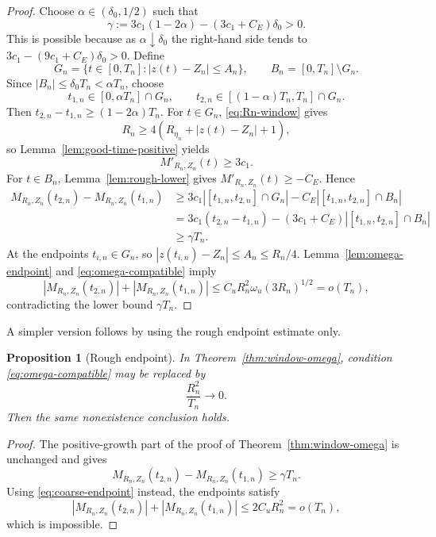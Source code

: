 \documentclass[preprint,12pt]{elsarticle}
\numberwithin{equation}{section}
\newtheorem{proposition}[theorem]{Proposition}
\theoremstyle{remark}
\begin{document}
\begin{proof}
Choose $\alpha\in(\delta_0,1/2)$ such that
\[
  \gamma:=3c_1(1-2\alpha)-(3c_1+C_E)\delta_0>0.
\]
This is possible because as $\alpha\downarrow\delta_0$ the right-hand side tends to $3c_1-(9c_1+C_E)\delta_0>0$.  Define
\[
  G_n=\{t\in[0,T_n]: |z(t)-Z_n|\le A_n\},
  \qquad B_n=[0,T_n]\setminus G_n.
\]
Since $|B_n|\le\delta_0T_n<\alpha T_n$, choose
\[
  t_{1,n}\in[0,\alpha T_n]\cap G_n,
  \qquad t_{2,n}\in[(1-\alpha)T_n,T_n]\cap G_n.
\]
Then $t_{2,n}-t_{1,n}\ge(1-2\alpha)T_n$.  For $t\in G_n$, \eqref{eq:Rn-window} gives
\[
  R_n\ge4(R_{\eta_n}+|z(t)-Z_n|+1),
\]
so Lemma~\ref{lem:good-time-positive} yields
\[
  M'_{R_n,Z_n}(t)\ge3c_1.
\]
For $t\in B_n$, Lemma~\ref{lem:rough-lower} gives $M'_{R_n,Z_n}(t)\ge-C_E$.  Hence
\begin{align*}
  M_{R_n,Z_n}(t_{2,n})-M_{R_n,Z_n}(t_{1,n})
  &\ge 3c_1|[t_{1,n},t_{2,n}]\cap G_n|
       -C_E|[t_{1,n},t_{2,n}]\cap B_n| \\
  &=3c_1(t_{2,n}-t_{1,n})-(3c_1+C_E)|[t_{1,n},t_{2,n}]\cap B_n| \\
  &\ge \gamma T_n.
\end{align*}
At the endpoints $t_{i,n}\in G_n$, so $|z(t_{i,n})-Z_n|\le A_n\le R_n/4$.  Lemma~\ref{lem:omega-endpoint} and \eqref{eq:omega-compatible} imply
\[
  |M_{R_n,Z_n}(t_{2,n})|+|M_{R_n,Z_n}(t_{1,n})|
  \le C_uR_n^2\omega_u(3R_n)^{1/2}=o(T_n),
\]
contradicting the lower bound $\gamma T_n$.
\end{proof}

A simpler version follows by using the rough endpoint estimate only.

\begin{proposition}[Rough endpoint]\label{prop:coarse-window}
In Theorem~\ref{thm:window-omega}, condition \eqref{eq:omega-compatible} may be replaced by
\begin{equation}\label{eq:coarse-compatible}
  \frac{R_n^2}{T_n}\to0.
\end{equation}
Then the same nonexistence conclusion holds.
\end{proposition}

\begin{proof}
The positive-growth part of the proof of Theorem~\ref{thm:window-omega} is unchanged and gives
\[
  M_{R_n,Z_n}(t_{2,n})-M_{R_n,Z_n}(t_{1,n})\ge \gamma T_n.
\]
Using \eqref{eq:coarse-endpoint} instead, the endpoints satisfy
\[
  |M_{R_n,Z_n}(t_{2,n})|+|M_{R_n,Z_n}(t_{1,n})|
  \le 2C_uR_n^2=o(T_n),
\]
which is impossible.
\end{proof}
\end{document}

